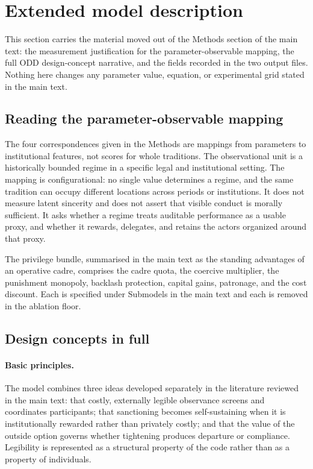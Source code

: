 \documentclass[12pt]{article}
\begin{document}
\clearpage

\section{Extended model description}
\label{sec:extended-model}

This section carries the material moved out of the Methods section of the main
text: the measurement justification for the parameter-observable mapping, the
full ODD design-concept narrative, and the fields recorded in the two output
files. Nothing here changes any parameter value, equation, or experimental grid
stated in the main text.

\subsection{Reading the parameter-observable mapping}

The four correspondences given in the Methods are mappings from parameters to
institutional features, not scores for whole traditions. The observational unit
is a historically bounded regime in a specific legal and institutional setting.
The mapping is configurational: no single value determines a regime, and the
same tradition can occupy different locations across periods or institutions.
It does not measure latent sincerity and does not assert that visible conduct
is morally sufficient. It asks whether a regime treats auditable performance as
a usable proxy, and whether it rewards, delegates, and retains the actors
organized around that proxy.

The privilege bundle, summarised in the main text as the standing advantages of
an operative cadre, comprises the cadre quota, the coercive multiplier, the
punishment monopoly, backlash protection, capital gains, patronage, and the
cost discount. Each is specified under Submodels in the main text and each is
removed in the ablation floor.

\subsection{Design concepts in full}

\paragraph{Basic principles.} The model combines three ideas developed
separately in the literature reviewed in the main text: that costly, externally
legible observance screens and coordinates participants; that sanctioning
becomes self-sustaining when it is institutionally rewarded rather than
privately costly; and that the value of the outside option governs whether
tightening produces departure or compliance. Legibility is represented as a
structural property of the code rather than as a property of individuals.
\end{document}
